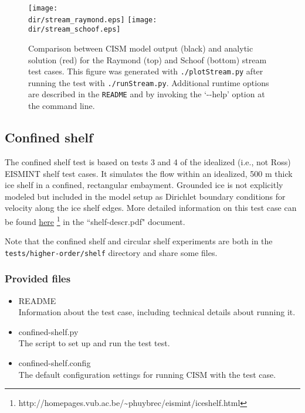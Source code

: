 	
\begin{figure}[H!]
  \begin{center}
	\texttt{[image: \\dir/stream\_raymond.eps]}
	\texttt{[image: \\dir/stream\_schoof.eps]}
  \end{center}
  \caption{Comparison between CISM model output (black) and analytic solution (red) for the Raymond (top) and Schoof (bottom) stream test cases. This figure was generated with \texttt{./plotStream.py} after running the test with \texttt{./runStream.py}.
Additional runtime options are described in the \texttt{README} and by invoking the `-{}-help' option at the command line.}
  \label{fig:stream-results}
\end{figure} 

\subsection{Confined shelf}
The confined shelf test is based on tests 3 and 4 of the idealized (i.e., not Ross) EISMINT shelf test 
cases.  It simulates the flow within an idealized, 500 m thick ice shelf in a 
confined, rectangular embayment.  Grounded ice is not explicitly modeled but included in the 
model setup as Dirichlet boundary conditions for velocity along the ice shelf edges.
More detailed information on this test case can be found 
\href{http://homepages.vub.ac.be/~phuybrec/eismint/iceshelf.html}{here}
\footnote{http://homepages.vub.ac.be/\textasciitilde{}phuybrec/eismint/iceshelf.html} in the 
``shelf-descr.pdf" document.

Note that the confined shelf and circular shelf experiments are both in the 
\texttt{tests/higher-order/shelf} directory and share some files.

\subsubsection{Provided files}

\begin{itemize}
	\item README \\
		Information about the test case, including technical details about running it.
	\item confined-shelf.py \\
		The script to set up and run the test test.
	\item confined-shelf.config \\
  The default configuration settings for running CISM with the test case.
\end{itemize}

